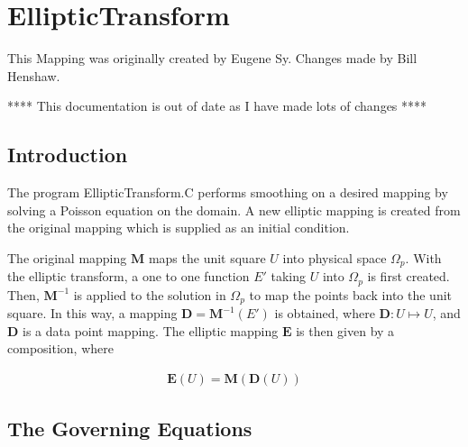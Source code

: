 \newcommand{\egr}{EllipticTransform.C}
\def\Grad{\mathop{\nabla}}
\def\ParS#1#2{\mathord{\frac{\partial^2{#1}}{\partial{#2}^2}}}
\def\vel{\mathord{\mathbf{V}}}
\def\Par#1#2{\mathord{\frac{\partial{#1}}{\partial{#2}}}}
\def\ParC#1#2#3{\mathord{\frac{\partial^2{#1}}{\partial{#2}\partial{#3}}}}
\def\velt{\mathord{\mathbf{V}_{\! \mathnormal{t}}}}
\def\bx{\mathord{\mathbf{x}}}
\def\Lap{\mathop{{\nabla}^2}}
\def\TrInt{\int\!\int\!\int}
\def\DbInt{\int\!\int}
\def\DA{{d}{\bf A}}
\def\velnp{\mathord{\mathbf{V}}^{n+1}}
\def\E{\mathord{\mathbf{E}}}
\def\Ei{\mathord{\mathbf{E}^{-1}}}
\def\M{\mathord{\mathbf{M}}}
\def\Mi{\mathord{\mathbf{M}^{-1}}}
\def\D{\mathord{\mathbf{D}}}
\def\xxi{\bx_\xi}
\def\xeta{\bx_\eta}
\def\xxixi{\bx_{\xi\xi}}
\def\xetaeta{\bx_{\eta\eta}}

\section{EllipticTransform}
  This Mapping was originally created by Eugene Sy. Changes made by Bill Henshaw.

 **** This documentation is out of date as I have made lots of changes ****


\subsection{Introduction}

The program {\egr} performs smoothing on a desired mapping by solving a Poisson equation
on the domain.  A new elliptic mapping is created from the original mapping which is
supplied as an initial condition.

The original mapping $\M$ maps the unit square $U$ into physical space $\Omega_p$.
With the elliptic transform, a one to one function $E'$ taking $U$ into 
$\Omega_p$ is first created.  Then,
$\Mi$ is applied to the solution in $\Omega_p$ to map the points back into the unit
square.  In this way, a mapping $\D=\Mi(E')$ is obtained, where $\D:U\mapsto U$, and 
$\D$ is a data point mapping.  The elliptic mapping $\E$ is then given by a 
composition, where

\begin{eqnarray*}
\E(U) = \M(\D(U))
\end{eqnarray*}

\subsection{The Governing Equations}


